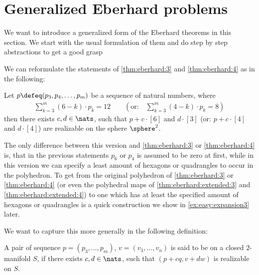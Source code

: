 \section{Generalized {\sc Eberhard} problems}\label{sec:gen:eberhard}

We want to introduce a generalized form of the {\sc Eberhard} theorems in this section. We start with the usual formulation of them and do step by step abstractions to get a good grasp

We can reformulate the statements of \autoref{thm:eberhard:3} and \autoref{thm:eberhard:4} as in the following:
\begin{theorem}
  Let $p \defeq (p_3, p_4, \dots, p_m)$ be a sequence of natural numbers, where
  \begin{align*}
    \sum_{k=3}^m(6 - k) \cdot p_k = 12 \qquad \left( \text{or:}\quad \sum_{k=3}^m(4 - k) \cdot p_k = 8 \right)
  \end{align*}
  then there exists $c, d \in \nats$, such that $p + c \cdot [6]$ and $d \cdot [3]$ (or: $p + c \cdot [4]$ and $d \cdot [4]$) are realizable on the sphere $\sphere^2$.
\end{theorem}

\begin{remark}\label{rem:gen:is:no:gen}
The only difference between this version and \autoref{thm:eberhard:3} or \autoref{thm:eberhard:4} is, that in the previous statements $p_6$ or $p_4$ is assumed to be zero at first, while in this version we can specify a least amount of hexagons or quadrangles to occur in the polyhedron. To get from the original polyhedron of \autoref{thm:eberhard:3} or \autoref{thm:eberhard:4} (or even the polyhedral maps of \autoref{thm:eberhard:extended:3} and \autoref{thm:eberhard:extended:4}) to one which has at least the specified amount of hexagons or quadrangles is a quick construction we show in \autoref{ex:easy:expansion3} later. 
\end{remark}

We want to capture this more generally in the following definition:
\begin{definition}\label{def:eberhard:realizable}
  A pair of sequence $p = (p_3, \dots, p_m)$, $v = (v_3, \dots, v_n)$ is said to be  on a closed $2$-manifold $S$, if there exists $c, d \in \nats$, such that $(p + c q, v + d w)$ is realizable on $S$. 
\end{definition}

